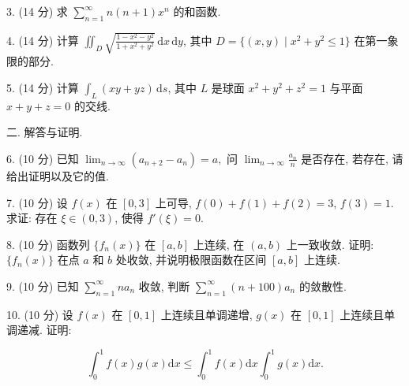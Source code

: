 \documentclass{examcollection}
\renewcommand{\displayformula}[1]{\[#1\]}
\begin{document}
{\begin{minipage}{\textwidth}
3. (14 分) 求 $\sum_{n=1}^{\infty} n(n+1)x^{n}$ 的和函数.\par
4. (14 分) 计算 $\iint_{D} \sqrt{\frac{1 - x^2 - y^2}{1 + x^2 + y^2}} \, \mathrm{d}x \, \mathrm{d}y$, 其中 $D = \{(x, y) \mid x^2 + y^2 \leq 1\}$ 在第一象限的部分.\par
5. (14 分) 计算 $\int_{L} (xy + yz) \, \mathrm{d}s$, 其中 $L$ 是球面 $x^{2} + y^{2} + z^{2} = 1$ 与平面 $x + y + z = 0$ 的交线.\par
二. 解答与证明.\par
6. (10 分) 已知 $\lim_{n\to \infty}(a_{n + 2} - a_n) = a,$ 问 $\lim_{n\to \infty}\frac{a_n}{n}$ 是否存在, 若存在, 请给出证明以及它的值.\par
7. (10 分) 设 $f(x)$ 在 $[0,3]$ 上可导, $f(0) + f(1) + f(2) = 3$, $f(3) = 1$. 求证: 存在 $\xi \in (0,3)$, 使得 $f'(\xi) = 0$.\par
8. (10 分) 函数列 $\{f_n(x)\}$ 在 $[a, b]$ 上连续, 在 $(a, b)$ 上一致收敛. 证明: $\{f_n(x)\}$ 在点 $a$ 和 $b$ 处收敛, 并说明极限函数在区间 $[a, b]$ 上连续.\par
9. (10 分) 已知 $\sum_{n=1}^{\infty} na_n$ 收敛, 判断 $\sum_{n=1}^{\infty} (n+100)a_n$ 的敛散性.\par
10. (10 分) 设 $f(x)$ 在 $[0,1]$ 上连续且单调递增, $g(x)$ 在 $[0,1]$ 上连续且单调递减. 证明:\par
\displayformula{\int_ {0} ^ {1} f (x) g (x) \mathrm{d} x \leq \int_ {0} ^ {1} f (x) \mathrm{d} x \int_ {0} ^ {1} g (x) \mathrm{d} x.}\par
\end{minipage}}
\ifdim\dimexpr\ht\proofbox+\dp\proofbox\relax>\textheight
\noindent\resizebox{!}{\textheight}{\usebox{\proofbox}}\else\noindent\usebox{\proofbox}\fi\clearpage
\end{document}
